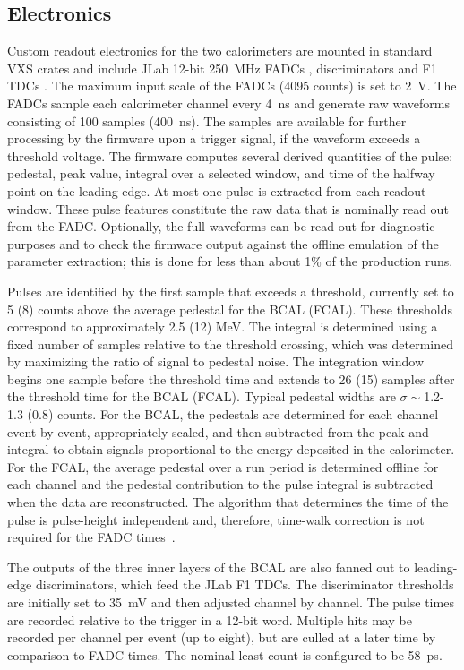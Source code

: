 \subsection{Electronics \label{sec:calelectronics}}
Custom readout electronics for the two calorimeters are mounted in standard VXS crates and include 
JLab 12-bit 250~MHz FADCs \cite{hdnote1022}, discriminators \cite{hdnote2511} and F1 TDCs \cite{hdnote1021}. The maximum input scale of the FADCs (4095 counts) is set to 2~V.
The FADCs sample each calorimeter channel every 4~ns and generate raw waveforms consisting of 100 samples 
 (400~ns). The samples are available for further processing by the firmware upon a trigger signal, if the waveform exceeds a threshold voltage. The firmware computes several derived quantities of the pulse: pedestal, peak value, integral over a selected window, and time of the halfway point on the leading edge. At most one pulse is extracted from each readout window. These pulse features constitute the raw data that is nominally read out from the FADC.  Optionally, the full waveforms can be read out for diagnostic purposes and to check the firmware output against the offline emulation of the parameter extraction; this is done for less than about 1\% of the production runs.
 
Pulses are identified by the first sample that exceeds a threshold, currently set to 5 (8) counts above the average pedestal for the BCAL (FCAL). These thresholds correspond to approximately 2.5 (12) MeV. The integral is determined using a fixed number of samples relative to the threshold crossing, which was determined by maximizing the ratio of signal to pedestal noise.  The integration window begins one sample before the threshold time and extends to 26 (15) samples after the threshold time for the BCAL (FCAL).  Typical pedestal widths are $\sigma\sim$1.2-1.3 (0.8) counts. For the BCAL, the pedestals are determined for each channel event-by-event, appropriately scaled, and then subtracted from the peak and integral to obtain signals proportional to the energy deposited in the calorimeter. For the FCAL, the average pedestal over a run period is determined offline for each channel and the pedestal contribution to the pulse integral is subtracted when the data are reconstructed.  %
 The algorithm that determines the time of the pulse is pulse-height independent and, therefore, time-walk correction is not required for the FADC times~\cite{Bennett:2010nf}.

The outputs of the three inner layers of the BCAL are also fanned out to leading-edge discriminators, which feed the JLab F1 TDCs. The discriminator thresholds are initially set to 35~mV and then adjusted
 channel by channel.  The pulse times are recorded relative to the trigger in a 12-bit word. Multiple hits may be recorded per channel per event (up to eight), but are culled at a later time by comparison to FADC times. The nominal least count is configured to be 58~ps.



